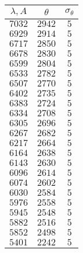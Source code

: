 \begin{tabular}{| c | c | c |}
\hline
$\lambda, A$ & $\theta$ & $\sigma_{\theta}$\\
\hline
$7032$ & $2942$ & $5$\\
\hline
$6929$ & $2914$ & $5$\\
\hline
$6717$ & $2850$ & $5$\\
\hline
$6678$ & $2830$ & $5$\\
\hline
$6599$ & $2804$ & $5$\\
\hline
$6533$ & $2782$ & $5$\\
\hline
$6507$ & $2770$ & $5$\\
\hline
$6402$ & $2735$ & $5$\\
\hline
$6383$ & $2724$ & $5$\\
\hline
$6334$ & $2708$ & $5$\\
\hline
$6305$ & $2696$ & $5$\\
\hline
$6267$ & $2682$ & $5$\\
\hline
$6217$ & $2664$ & $5$\\
\hline
$6164$ & $2638$ & $5$\\
\hline
$6143$ & $2630$ & $5$\\
\hline
$6096$ & $2614$ & $5$\\
\hline
$6074$ & $2602$ & $5$\\
\hline
$6030$ & $2584$ & $5$\\
\hline
$5976$ & $2558$ & $5$\\
\hline
$5945$ & $2548$ & $5$\\
\hline
$5882$ & $2516$ & $5$\\
\hline
$5852$ & $2498$ & $5$\\
\hline
$5401$ & $2242$ & $5$\\
\hline
\end{tabular}
